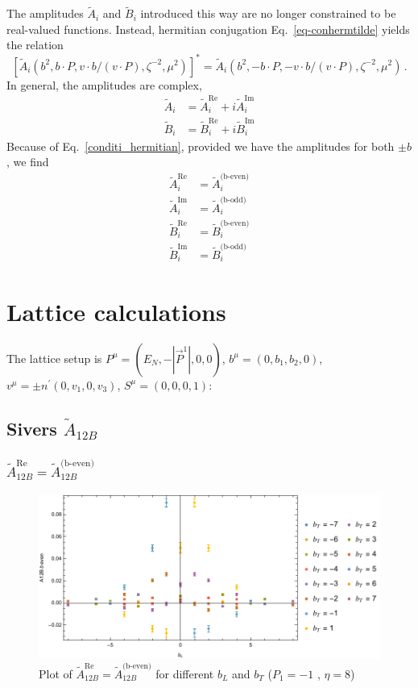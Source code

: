 \documentclass[]{article}
\numberwithin{equation}{section}
\newcommand{\tcdot}{{\cdot}}
\newcommand{\tAmp}{\widetilde{A}}
\newcommand{\tBmp}{\widetilde{B}}
\newcommand{\tAmp}{\ensuremath{\widetilde{A}^{(+)}}}
\newcommand{\tBmp}{\ensuremath{\widetilde{B}^{(+)}}}
\newcommand{\elll}{b}
\begin{document}
The amplitudes $\tAmp_i$ and $\tBmp_i$ introduced this way are no longer constrained to be real-valued functions. Instead, hermitian conjugation Eq.\ \eqref{eq-conhermtilde} yields the relation
\begin{equation}
	\left[ \tAmp_i(\elll^2,\elll \tcdot P, v \tcdot \elll / (v \tcdot P), \zeta^{-2},\mu^2) \right]^* = \tAmp_i(\elll^2,-\elll \tcdot P, -v \tcdot \elll / (v \tcdot P), \zeta^{-2},\mu^2)\, .\label{conditi_hermitian}
\end{equation}
In general, the amplitudes are complex,
\begin{align}
    \tilde{A}_i&=\tilde{A}^{\text{Re}}_i+i\tilde{A}^{\text{Im}}_i\\
    \tilde{B}_i&=\tilde{B}^{\text{Re}}_i+i\tilde{B}^{\text{Im}}_i
\end{align}
Because of Eq.\ \eqref{conditi_hermitian}, provided we have the amplitudes for both $\pm b$, we find
\begin{align}
    \tilde{A}^{\text{Re}}_i&=\tilde{A}^{\text{(b-even)}}_i\\
    \tilde{A}^{\text{Im}}_i&=\tilde{A}^{\text{(b-odd})}_i\\
    \tilde{B}^{\text{Re}}_i&=\tilde{B}^{\text{(b-even)}}_i\\
    \tilde{B}^{\text{Im}}_i&=\tilde{B}^{\text{(b-odd})}_i
\end{align}

\pagebreak
\section{Lattice calculations}
The lattice setup is $P^{\mu}=(E_N, -|\vec{P}^1|,0,0)$, $b^{\mu}=(0,b_{1},b_{2},0)$, $v^{\mu}=\pm n^{\prime}(0,v_{1},0,v_{3})$, $S^{\mu}=(0,0,0,1)$:
\subsection{Sivers $\tAmp_{12B}$}
\subsubsection{$\tAmp^{\text{Re}}_{12B}=\tAmp^{\text{(b-even)}}_{12B}$}
\begin{figure}[h!]
    \centering
    \includegraphics[width=0.45\linewidth]{bLbT_A12B_b_even_P1_-1_eta_8.pdf}
    \caption{Plot of  $\tAmp^{\text{Re}}_{12B}=\tAmp^{\text{(b-even)}}_{12B}$ for different $b_{L}$ and $b_{T}$  ($P_{1} = -1$ , $\eta=8$)}
\end{figure}
\end{document}
